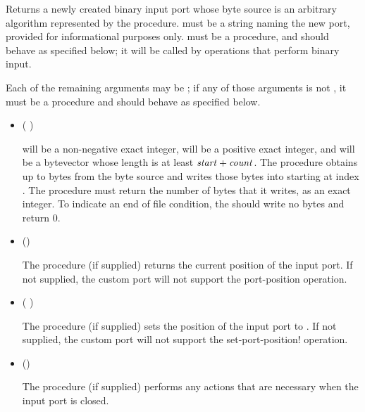 \begin{entry}{%
}

Returns a newly created binary input port whose byte source is
an arbitrary algorithm represented by the  procedure.
 must be a string naming the new port,
provided for informational purposes only.
 must be a procedure, and should behave as specified
below; it will be called by operations that perform binary input.

Each of the remaining arguments may be \schfalse{}; if any of
those arguments is not \schfalse{}, it must be a procedure and
should behave as specified below.
   
\begin{itemize}
\item {\cf (   )}
       
   will be a non-negative exact integer,
   will be a positive exact integer,
  and  will be a bytevector whose length is at least
  $\textnormal{\textit{start}} + \textnormal{\textit{count}}$.
  The  procedure obtains up to  bytes
  from the byte source and writes those bytes
  into  starting at index .
  The  procedure must return the number of bytes
  that it writes, as an exact integer.
  To indicate an end of file condition, the 
  should write no bytes and return 0.

\item {\cf ()}
       
  The  procedure (if supplied)
  returns the current position of the input port.
  If not supplied, the custom port will not support
  the {\cf port-position} operation.
  
\item {\cf ( )}
       
  The  procedure (if supplied) sets the position
  of the input port to .
  If not supplied, the custom port will not support
  the {\cf set-port-position!} operation.
       
\item {\cf ()}
       
  The  procedure (if supplied) performs any
  actions that are necessary when the input port is closed.
\end{itemize}

\end{entry}

